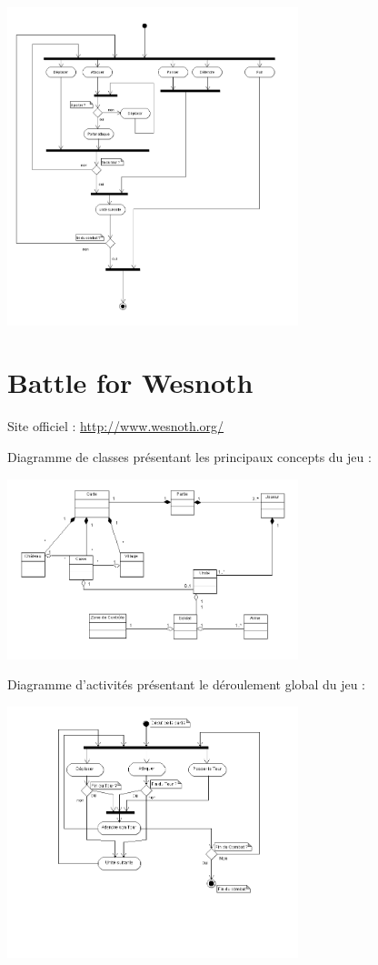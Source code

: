 \documentclass[a4paper,10pt]{report}
\begin{document}
    \includegraphics[width=320px]{diagrammes/sequence-homm.png}
    

	\section{Battle for Wesnoth}
	
    Site officiel : \url{http://www.wesnoth.org/}
    
    Diagramme de classes présentant les principaux concepts du jeu : 
    
		\includegraphics[width=320px]{diagrammes/Concept-Battle-of-Wesnoth.png}

    Diagramme d'activités présentant le déroulement global du jeu : 
    
    \includegraphics[width=320px]{diagrammes/Diagramme_Activites_BoW.png}
    
\end{document}
